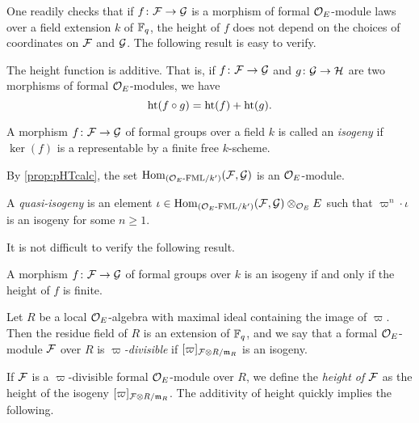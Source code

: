 \documentclass[../main.tex]{subfiles}
\begin{document}
One readily checks that if $f\colon  \mathcal{F} \to \mathcal{G}$ is a morphism of formal
$\mathcal{O}_E$-module laws over a field extension $k$ of $\mathbb{F}_q$, the height of $f$
does not depend on the choices of coordinates on $\mathcal{F}$ and $\mathcal{G}$. The following result is easy to verify.

\begin{lem}
    The height function is additive. That is, if 
    $f\colon \mathcal{F} \to \mathcal{G}$ and $g\colon \mathcal{G} \to \mathcal{H}$
    are two morphisms of formal $\mathcal{O}_E$-modules, we have
    \begin{equation*}
        \textnormal{ht}(f\circ g) = \textnormal{ht}(f) + \textnormal{ht}(g).
    \end{equation*}
\end{lem}

\begin{defi}[Isogeny]
  A morphism $f\colon  \mathcal{F} \to \mathcal{G}$ of formal groups over a field $k$ is called
  an \emph{isogeny} if $\ker(f)$ is a representable by a finite free $k$-scheme. 
\end{defi}

 By \cref{prop:pHTcalc}, the set $\operatorname{Hom}_{{({\mathcal{O}_E}\textnormal-\allowbreak\mathrm{FML}/{k'})}}(\mathcal{F}, \mathcal{G})$ is an   $\mathcal{O}_E$-module. 
\begin{defi}
    A \emph{quasi-isogeny} is an element $\iota \in \operatorname{Hom}_{{({\mathcal{O}_E}\textnormal-\allowbreak\mathrm{FML}/{k'})}}(\mathcal{F}, \mathcal{G}) \otimes_{\mathcal{O}_E} E$ such that 
  $\varpi^n \cdot \iota$ is an isogeny for some $n \geq 1$. 

\end{defi}

It is not difficult to verify the following result. 
\begin{lem}
  A morphism $f\colon  \mathcal{F} \to \mathcal{G}$ of formal groups over $k$
  is an isogeny if and only if the height of $f$ is finite. 
\end{lem}

\begin{defi}
  Let $R$ be a local $\mathcal{O}_E$-algebra with maximal ideal containing the 
  image of $\varpi$.
  Then the residue field of $R$ is an extension of 
  $\mathbb{F}_q$, and we say that a formal $\mathcal{O}_E$-module $\mathcal{F}$ over $R$ is
  \emph{$\varpi$-divisible} if 
  $[\varpi]_{\mathcal{F} \otimes R/\mathfrak{m}_R}$ is an isogeny. 
\end{defi}

If $\mathcal{F}$ is a $\varpi$-divisible formal $\mathcal{O}_E$-module
over $R$, we define the \emph{height of $\mathcal{F}$}
  as the height of the isogeny $[\varpi]_{\mathcal{F} \otimes R/\mathfrak{m}_R}$.
The additivity of height quickly implies the following.
\end{document}
